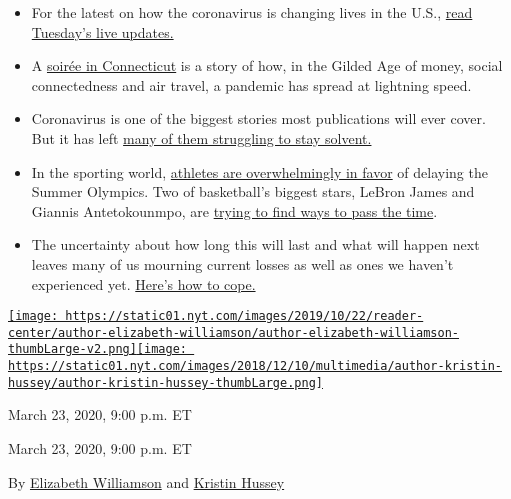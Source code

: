 \begin{itemize}
\item
  For the latest on how the coronavirus is changing lives in the U.S.,
  \href{https://www.nytimes.com/live/2020/coronavirus-usa-live-03-24}{read
  Tuesday's live updates.}
\item
  A
  \href{https://www.nytimes.com/2020/03/23/us/coronavirus-westport-connecticut-party-zero.html?action=click\&module=Spotlight\&pgtype=Homepage}{soirée
  in Connecticut} is a story of how, in the Gilded Age of money, social
  connectedness and air travel, a pandemic has spread at lightning
  speed.
\item
  Coronavirus is one of the biggest stories most publications will ever
  cover. But it has left
  \href{https://www.nytimes.com/2020/03/23/business/media/coronavirus-local-news.html?action=click\&module=RelatedLinks\&pgtype=Article}{many
  of them struggling to stay solvent.}
\item
  In the sporting world,
  \href{https://www.nytimes.com/2020/03/23/sports/olympics/track-and-field-poll-Olympics-coronavirus.html}{athletes
  are overwhelmingly in favor} of delaying the Summer Olympics. Two of
  basketball's biggest stars, LeBron James and Giannis Antetokounmpo,
  are
  \href{https://www.nytimes.com/live/2020/coronavirus-updates-news-03-23\#you-cant-watch-giannis-antetokounmpo-hoop-but-you-can-watch-him-strum}{trying
  to find ways to pass the time}.
\item
  The uncertainty about how long this will last and what will happen
  next leaves many of us mourning current losses as well as ones we
  haven't experienced yet.
  \href{https://www.nytimes.com/2020/03/23/well/family/coronavirus-grief-loss.html?action=click\&module=RelatedLinks\&pgtype=Article}{Here's
  how to cope.}
\end{itemize}

\href{https://www.nytimes.com/by/elizabeth-williamson}{\texttt{[image: https://static01.nyt.com/images/2019/10/22/reader-center/author-elizabeth-williamson/author-elizabeth-williamson-thumbLarge-v2.png]}}\href{https://www.nytimes.com/by/kristin-hussey}{\texttt{[image: https://static01.nyt.com/images/2018/12/10/multimedia/author-kristin-hussey/author-kristin-hussey-thumbLarge.png]}}

March 23, 2020, 9:00 p.m. ET

March 23, 2020, 9:00 p.m. ET

By \href{https://www.nytimes.com/by/elizabeth-williamson}{Elizabeth
Williamson} and \href{https://www.nytimes.com/by/kristin-hussey}{Kristin
Hussey}

